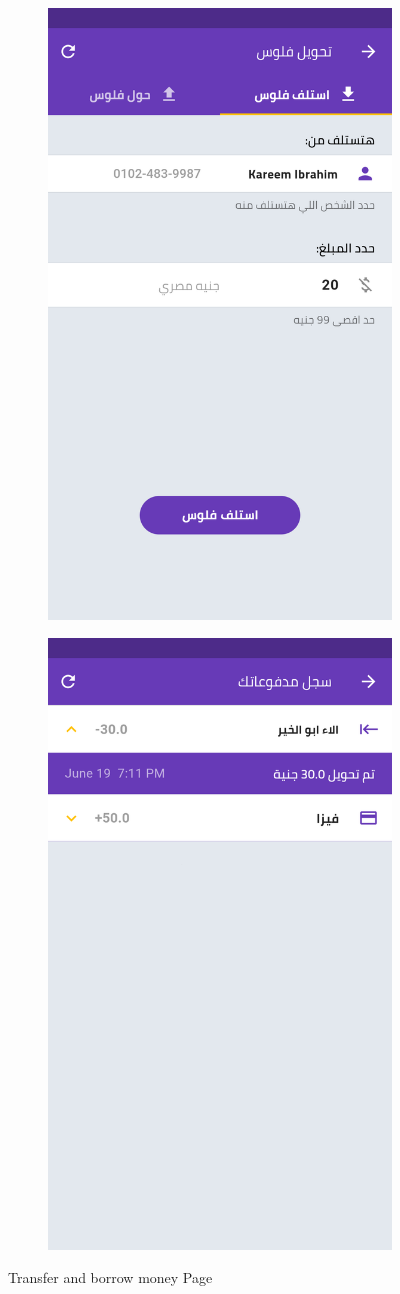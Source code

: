       \begin{figure}[H] 

    \begin{subfigure}[b]{0.5\linewidth}
    \centering
    \includegraphics[width=0.5\linewidth]{images/ch3/payment/Loaning/1.png}
  
  \end{subfigure}%
   \begin{subfigure}[b]{0.5\linewidth}
    \centering
    \includegraphics[width=0.5\linewidth]{images/ch3/payment/Loaning/7.png}
  
  \end{subfigure}%
    \caption{Transfer and borrow money Page}

  \end{figure}
